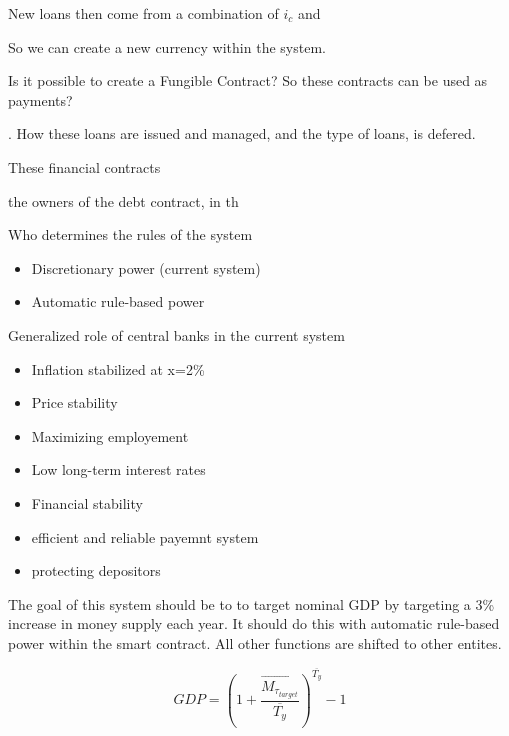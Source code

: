 New loans then come from a combination of $i_{c}$ and



So we can create a new currency within the system. 




Is it possible to create a Fungible Contract? So these contracts can be used as payments? 




. How these loans are issued and managed, and the type of loans, is defered. 

These financial contracts 


 the owners of the debt contract, in th


Who determines the rules of the system
\begin{itemize}
    \item Discretionary power (current system)
    \item Automatic rule-based power
\end{itemize}

Generalized role of central banks in the current system \cite{Stellinga2021}
\begin{itemize}
    \item Inflation stabilized at x=2\%
    \item Price stability
    \item Maximizing employement
    \item Low long-term interest rates
    \item Financial stability
    \item efficient and reliable payemnt system
    \item protecting depositors 
\end{itemize}

The goal of this system should be to to target nominal GDP by targeting a 3\% increase in money supply each year. It should do this with automatic rule-based power within the smart contract. All other functions are shifted to other entites. 

\begin{equation}
    GDP = (1+\frac{\overrightarrow{M_{\tau_{target}}}}{\overline{T_{y}}})^{\overline{T_{y}}} - 1
\end{equation}




